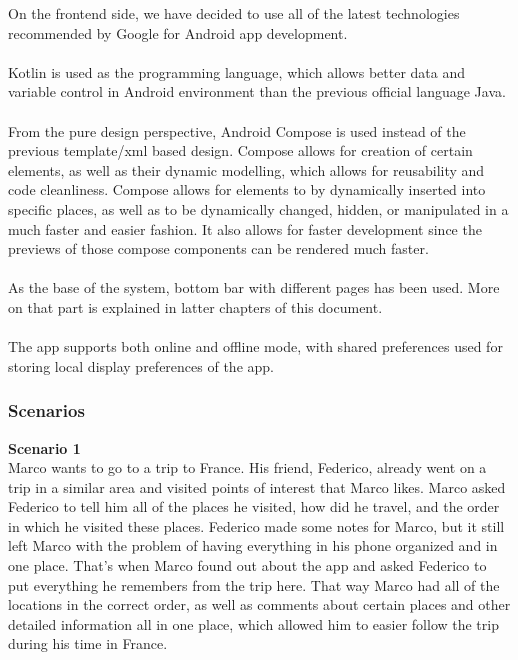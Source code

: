 On the frontend side, we have decided to use all of the latest technologies recommended by Google for Android app development. \\ \\
Kotlin is used as the programming language, which allows better data and variable control in Android environment than the previous official language Java.\\ \\
From the pure design perspective, Android Compose is used instead of the previous template/xml based design. Compose allows for creation of certain elements, as well as their dynamic modelling, which allows for reusability and code cleanliness. Compose allows for elements to by dynamically inserted into specific places, as well as to be dynamically changed, hidden, or manipulated in a much faster and easier fashion. It also allows for faster development since the previews of those compose components can be rendered much faster.\\ \\
As the base of the system, bottom bar with different pages has been used. More on that part is explained in latter chapters of this document.
\\ \\ 
The app supports both online and offline mode, with shared preferences used for storing local display preferences of the app.\\
\newpage

\subsubsection{Scenarios}

\textbf{Scenario 1}\\

\hspace{\parindent}Marco wants to go to a trip to France. His friend, Federico, already went on a trip in a similar area and visited points of interest that Marco likes. Marco asked Federico to tell him all of the places he visited, how did he travel, and the order in which he visited these places. Federico made some notes for Marco, but it still left Marco with the problem of having everything in his phone organized and in one place. That's when Marco found out about the app and asked Federico to put everything he remembers from the trip here. That way Marco had all of the locations in the correct order, as well as comments about certain places and other detailed information all in one place, which allowed him to easier follow the trip during his time in France.\\

